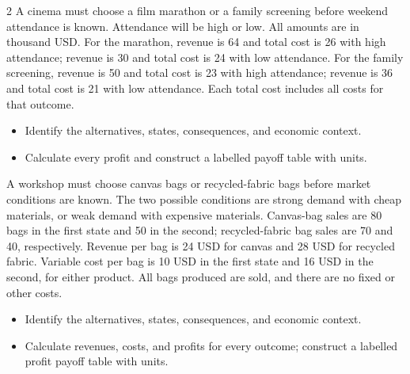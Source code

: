 \begin{multicols}{2}
A cinema must choose a film marathon or a family screening before weekend attendance is known. Attendance will be high or low. All amounts are in thousand USD. For the marathon, revenue is 64 and total cost is 26 with high attendance; revenue is 30 and total cost is 24 with low attendance. For the family screening, revenue is 50 and total cost is 23 with high attendance; revenue is 36 and total cost is 21 with low attendance. Each total cost includes all costs for that outcome.
\begin{itemize}
\item[\textbf{(C1)}] Identify the alternatives, states, consequences, and economic context. 
\item[\textbf{(C3)}] Calculate every profit and construct a labelled payoff table with units. 
\end{itemize}
\columnbreak
{}
A workshop must choose canvas bags or recycled-fabric bags before market conditions are known. The two possible conditions are strong demand with cheap materials, or weak demand with expensive materials. Canvas-bag sales are 80 bags in the first state and 50 in the second; recycled-fabric bag sales are 70 and 40, respectively. Revenue per bag is 24 USD for canvas and 28 USD for recycled fabric. Variable cost per bag is 10 USD in the first state and 16 USD in the second, for either product. All bags produced are sold, and there are no fixed or other costs.
\begin{itemize}
\item[\textbf{(C1)}] Identify the alternatives, states, consequences, and economic context. 
\item[\textbf{(C3)}] Calculate revenues, costs, and profits for every outcome; construct a labelled profit payoff table with units. 
\end{itemize}


\end{multicols}
